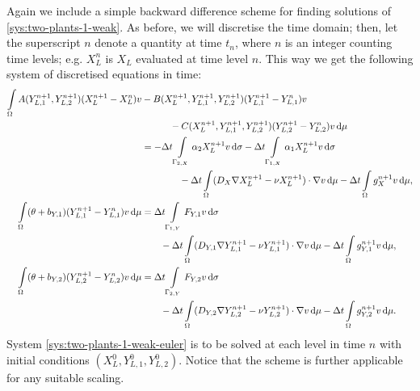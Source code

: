 \documentclass[11pt]{article}
\numberwithin{equation}{section}
\begin{document}
Again we include a simple backward difference scheme for finding solutions of \eqref{sys:two-plants-1-weak}. As before, we will discretise the time domain; then, let the superscript $n$ denote a quantity at time $t_n$, where $n$ is an integer counting time levels; e.g. $X_L^n$ is $X_L$ evaluated at time level $n$. This way we get the following system of discretised equations in time:
\begin{subequations}
\label{sys:two-plants-1-weak-euler}
\begin{align}
    \int\limits_\Omega
    A(Y_{L,1}^{n+1}, Y_{L,2}^{n+1}) (X_L^{n+1} - X_L^n) v &- B(X_L^{n+1}, Y_{L,1}^{n+1}, Y_{L,2}^{n+1}) (Y_{L,1}^{n+1} - Y_{L,1}^n) v 
    \notag
    \\
    &\qquad\quad - C(X_L^{n+1}, Y_{L,1}^{n+1}, Y_{L,2}^{n+1}) (Y_{L,2}^{n+1} - Y_{L,2}^n) v \dif \mu 
    \notag
    \\
    &= -\Delta t
    \int\limits_{\Gamma_{2,X}}  \alpha_2 X_L^{n+1} v \dif \sigma
    - \Delta t \int\limits_{\Gamma_{1,X}} \alpha_1 X_L^{n+1} v \dif \sigma
    \\
    &\qquad\qquad - \Delta t \int\limits_\Omega
    (D_X \nabla X_L^{n+1} - \nu X_L^{n+1}) \cdot \nabla v  \dif \mu
    - \Delta t \int\limits_\Omega g_X^{n+1} v \dif \mu,
    \notag
    \\
    \int\limits_\Omega (\theta + b_{Y,1}) (Y_{L,1}^{n+1} - Y_{L,1}^n) v \dif \mu  &=
    \Delta t \int\limits_{\Gamma_{1,Y}} F_{Y,1} v \dif\sigma
    \notag \\ & \qquad
    - \Delta t \int\limits_\Omega (D_{Y,1} \nabla Y_{L,1}^{n+1} - \nu Y_{L,1}^{n+1}) \cdot \nabla v \dif\mu -  \Delta t \int\limits_\Omega g_{Y,1}^{n+1} v \dif\mu,
    \\
    \int\limits_\Omega (\theta + b_{Y,2}) (Y_{L,2}^{n+1} - Y_{L,2}^n) v \dif\mu  &= \Delta t \int\limits_{\Gamma_{2,Y}} F_{Y,2} v \dif\sigma 
    \notag \\ & \qquad
    - \Delta t 
    \int\limits_\Omega (D_{Y,2} \nabla Y_{L,2}^{n+1} - \nu Y_{L,2}^{n+1}) \cdot \nabla v \dif\mu - \Delta t \int\limits_\Omega g_{Y,2}^{n+1} v \dif\mu.
\end{align}
\end{subequations}
System \eqref{sys:two-plants-1-weak-euler} is to be solved at each level in time \( n\) with initial conditions \( (X_L^0,Y_{L,1}^0, Y_{L,2}^0)\). Notice that the scheme is further applicable for any suitable scaling.
\end{document}
